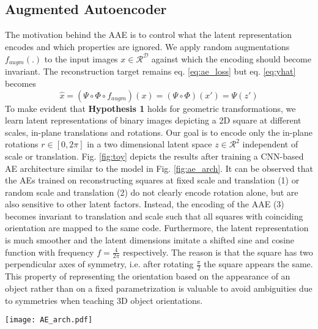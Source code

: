 \subsection{Augmented Autoencoder}
\label{sec:aae}

The motivation behind the \gls{AAE} is to control what the latent representation encodes and which properties are ignored. We apply random augmentations $f_{augm}(.)$ to the input images $x \in \mathcal{R}^{\mathcal{D}}$ against which the encoding should become invariant. The reconstruction target remains eq. \eqref{eq:ae_loss} but eq. \eqref{eq:yhat} becomes
\begin{equation}
\hat{x} = (\Psi\circ\Phi\circ f_{augm})(x) = (\Psi\circ\Phi)(x') = \Psi(z')
\end{equation}
To make evident that \textbf{Hypothesis 1} holds for geometric transformations, we learn latent representations of binary images depicting a 2D square at different scales, in-plane translations and rotations. Our goal is to encode only the in-plane rotations $r \in [0,2 \pi]$ in a two dimensional latent space $z \in \mathcal{R}^{2}$ independent of scale or translation. Fig. \ref{fig:toy} depicts the results after training a \gls{CNN}-based \gls{AE} architecture similar to the model in Fig. \ref{fig:ae_arch}. It can be observed that the \glspl{AE} trained on reconstructing squares at fixed scale and translation (1) or random scale and translation (2) do not clearly encode rotation alone, but are also sensitive to other latent factors. Instead, the encoding of the \gls{AAE} (3) becomes invariant to translation and scale such that all squares with coinciding orientation are mapped to the same code. Furthermore, the latent representation is much smoother and the latent dimensions imitate a shifted sine and cosine function with frequency $f=\frac{4}{2 \pi}$ respectively. The reason is that the square has two perpendicular axes of symmetry, i.e. after rotating $\frac{\pi}{2}$ the square appears the same. This property of representing the orientation based on the appearance of an object rather than on a fixed parametrization is valuable to avoid ambiguities due to symmetries when teaching 3D object orientations.

\begin{figure*}[t]\centering
	\captionsetup{width=\textwidth}
	\texttt{[image: AE\_arch.pdf]}
	\caption{Autoencoder CNN architecture with occluded test input, "resize2x" depicts nearest-neighbor upsampling}
	\label{fig:ae_arch}
\end{figure*}

